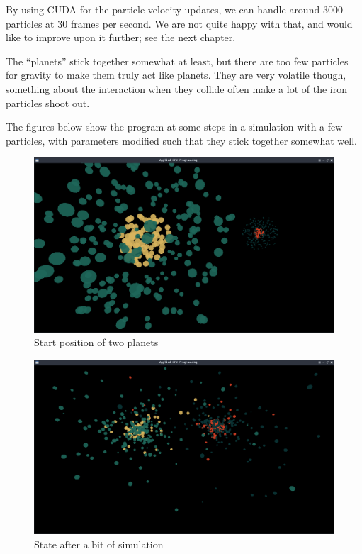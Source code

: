\documentclass[11pt,a4paper,article,oneside]{memoir}
\begin{document}
By using CUDA for the particle velocity updates, we can handle around 3000 particles at 30 frames per second.
We are not quite happy with that, and would like to improve upon it further; see the next chapter.

The ``planets'' stick together somewhat at least, but there are too few particles for gravity to make them truly act like planets.
They are very volatile though, something about the interaction when they collide often make a lot of the iron particles shoot out.

The figures below show the program at some steps in a simulation with a few particles, with parameters modified such that they stick together somewhat well.

\begin{figure}[h]
\center
\includegraphics[width=12cm]{img1}
\caption{Start position of two planets}
\end{figure}

\begin{figure}[h]
\center
\includegraphics[width=12cm]{img2}
\caption{State after a bit of simulation}
\end{figure}
\end{document}
